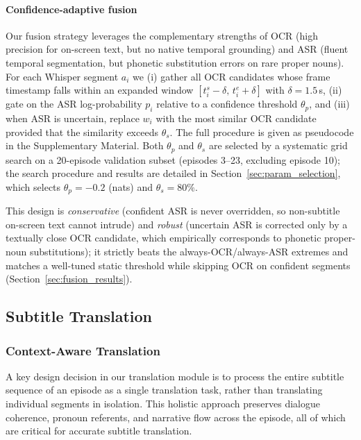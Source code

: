 \documentclass[journal]{IEEEtran}
\begin{document}
\paragraph{Confidence-adaptive fusion}
Our fusion strategy leverages the complementary strengths of OCR (high precision for on-screen text, but no native temporal grounding) and ASR (fluent temporal segmentation, but phonetic substitution errors on rare proper nouns).
For each Whisper segment $a_i$ we (i) gather all OCR candidates whose frame timestamp falls within an expanded window $[t_i^s - \delta,\, t_i^e + \delta]$ with $\delta = 1.5$\,s, (ii) gate on the ASR log-probability $p_i$ relative to a confidence threshold $\theta_p$, and (iii) when ASR is uncertain, replace $w_i$ with the most similar OCR candidate provided that the similarity exceeds $\theta_s$.
The full procedure is given as pseudocode in the Supplementary Material.
Both $\theta_p$ and $\theta_s$ are selected by a systematic grid search on a 20-episode validation subset (episodes 3--23, excluding episode 10); the search procedure and results are detailed in Section~\ref{sec:param_selection}, which selects $\theta_p = -0.2$ (nats) and $\theta_s = 80\%$.



This design is \emph{conservative} (confident ASR is never overridden, so non-subtitle on-screen text cannot intrude) and \emph{robust} (uncertain ASR is corrected only by a textually close OCR candidate, which empirically corresponds to phonetic proper-noun substitutions); it strictly beats the always-OCR/always-ASR extremes and matches a well-tuned static threshold while skipping OCR on confident segments (Section~\ref{sec:fusion_results}).

\subsection{Subtitle Translation}
\label{sec:translation}

\subsubsection{Context-Aware Translation}
A key design decision in our translation module is to process the entire subtitle sequence of an episode as a single translation task, rather than translating individual segments in isolation.
This holistic approach preserves dialogue coherence, pronoun referents, and narrative flow across the episode, all of which are critical for accurate subtitle translation.
\end{document}
